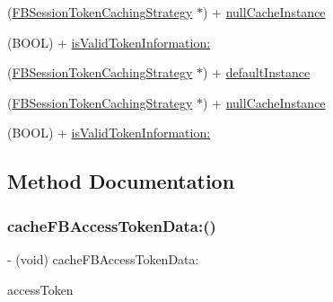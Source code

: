 \begin{DoxyCompactItemize}
(\hyperlink{interfaceFBSessionTokenCachingStrategy}{F\+B\+Session\+Token\+Caching\+Strategy} $\ast$) + \hyperlink{interfaceFBSessionTokenCachingStrategy_a97f1da9c8423d4e6bbca2241bd894032}{null\+Cache\+Instance}
\item 
(B\+O\+OL) + \hyperlink{interfaceFBSessionTokenCachingStrategy_a3974571bceb0745f400bf2a6674a963f}{is\+Valid\+Token\+Information\+:}
\item 
(\hyperlink{interfaceFBSessionTokenCachingStrategy}{F\+B\+Session\+Token\+Caching\+Strategy} $\ast$) + \hyperlink{interfaceFBSessionTokenCachingStrategy_a293d422412b33d069fef99f651b74b87}{default\+Instance}
\item 
(\hyperlink{interfaceFBSessionTokenCachingStrategy}{F\+B\+Session\+Token\+Caching\+Strategy} $\ast$) + \hyperlink{interfaceFBSessionTokenCachingStrategy_a97f1da9c8423d4e6bbca2241bd894032}{null\+Cache\+Instance}
\item 
(B\+O\+OL) + \hyperlink{interfaceFBSessionTokenCachingStrategy_a3974571bceb0745f400bf2a6674a963f}{is\+Valid\+Token\+Information\+:}
\end{DoxyCompactItemize}


\subsection{Method Documentation}
\mbox{\label{interfaceFBSessionTokenCachingStrategy_a35d668a867fcc88c491bb8d0c815c9f9}} 
\subsubsection{\texorpdfstring{cache\+F\+B\+Access\+Token\+Data\+:()}{cacheFBAccessTokenData:()}\hspace{0.1cm}{\footnotesize\ttfamily [1/5]}}
{\footnotesize\ttfamily -\/ (void) cache\+F\+B\+Access\+Token\+Data\+: \begin{DoxyParamCaption}\item[{(\hyperlink{interfaceFBAccessTokenData}{F\+B\+Access\+Token\+Data} $\ast$)}]{access\+Token }\end{DoxyParamCaption}}


